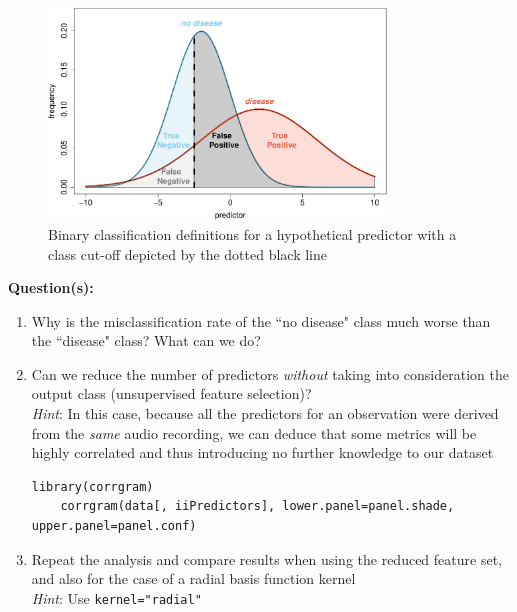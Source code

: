 \documentclass[a4paper,11pt]{article}
\begin{document}
\begin{figure}[htbp]
	\centering
	\includegraphics[width=0.8\textwidth]{DefinitionsPlot.pdf}
	\caption{Binary classification definitions for a hypothetical predictor with a class cut-off depicted by the dotted black line}
	\label{fig:DefinitionsPlot}
\end{figure}

\begin{framed}
\textbf{Question(s):}
\begin{enumerate}
	\item Why is the misclassification rate of the ``no disease" class much worse than the ``disease" class? What can we do?
	\item Can we reduce the number of predictors \textit{without} taking into consideration the output class (unsupervised feature selection)? 
	\\
	\textit{Hint}: In this case, because all the predictors for an observation were derived from the \textit{same} audio recording, 
	we can deduce that some metrics will be highly correlated and thus introducing no further knowledge to our dataset
	\\
	\begin{lstlisting}[style=RCode, backgroundcolor=\color{white}]
	library(corrgram)
	corrgram(data[, iiPredictors], lower.panel=panel.shade, upper.panel=panel.conf)
	\end{lstlisting}
	\vspace{-0.6cm} %
	\item Repeat the analysis and compare results when using the reduced feature set, and also for the case of a radial basis function kernel 
	\\
	\textit{Hint}: Use {\lstinline[style=RCode, basicstyle=\normalsize\ttfamily] |kernel="radial"|}
	\vspace{-0.5cm} %
\end{enumerate}
\end{framed}

\end{document}
